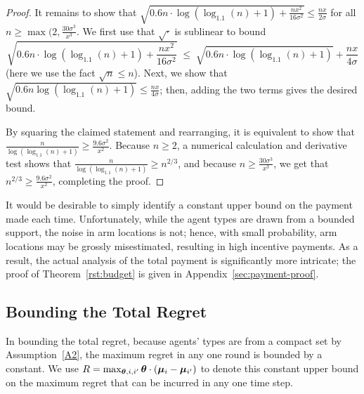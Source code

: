 \begin{proof}
It remains to show that
$\sqrt{0.6 n \cdot \log (\log_{1.1}(n) + 1) + \frac{n x^2}{16 \sigma^2}}
\leq \frac{n x}{2 \sigma}$
for all $n \geq \max(2, \frac{30 \sigma^3}{x^3}$.
We first use that $\sqrt{\cdot}$ is sublinear to bound
\[
  \sqrt{0.6 n \cdot \log (\log_{1.1}(n) + 1) + \frac{n x^2}{16 \sigma^2}}
\; \leq \; \sqrt{0.6 n \cdot \log (\log_{1.1}(n) + 1)} + \frac{n x}{4 \sigma}
\]
(here we use the fact $\sqrt{n} \leq n$).
Next, we show that
$\sqrt{0.6 n \log (\log_{1.1}(n) + 1)} \leq \frac{n x}{4 \sigma}$;
then, adding the two terms gives the desired bound.

By squaring the claimed statement and rearranging,
it is equivalent to show that
$\frac{n}{\log(\log_{1.1}(n)+1)} \geq \frac{9.6\sigma^2}{x^2}$.
Because $n \geq 2$,
a numerical calculation and derivative test shows that
$\frac{n}{\log(\log_{1.1}(n)+1)} \geq n^{2/3}$,
and because $n \geq \frac{30 \sigma^3}{x^3}$,
we get that
$n^{2/3} \geq \frac{9.6 \sigma^2}{x^2}$, completing the proof.

\end{proof}

It would be desirable to simply identify a constant upper bound on the
payment made each time.
Unfortunately, while the agent types are drawn from a bounded support,
the noise in arm locations is not;
hence, with small probability, arm locations may be grossly
misestimated, resulting in high incentive payments.
As a result, the actual analysis of the total payment is significantly more
intricate;
the proof of Theorem~\ref{rst:budget} is given in
Appendix~\ref{sec:payment-proof}.


\subsection{Bounding the Total Regret}
In bounding the total regret, because agents' types are from a compact
set by Assumption~\ref{A2}, the maximum regret in any one round is
bounded by a constant.
We use $R = \max_{\bm{\theta}, i,i'} \bm{\theta} \cdot (\bm{\mu}_{i} - \bm{\mu}_{i'})$
to denote this constant upper bound on the maximum regret that can be
incurred in any one time step. 



